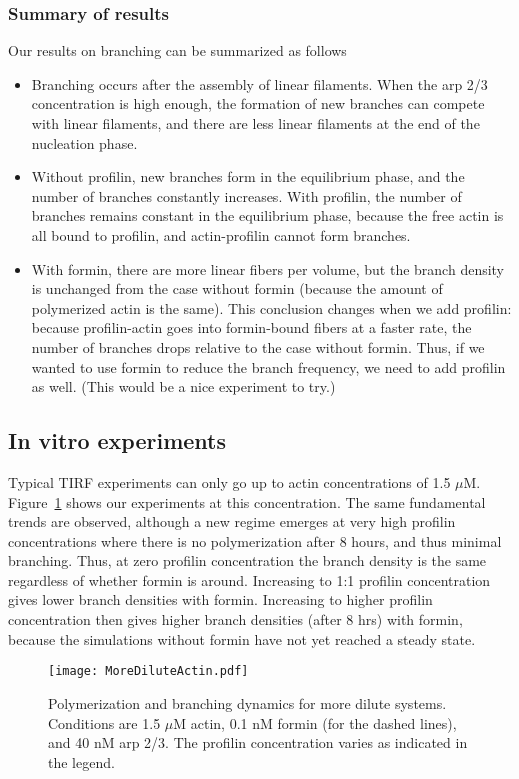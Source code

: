 \documentclass[11pt]{article}
\newcommand{\red}[1]{\color{red}#1\normalcolor}
\begin{document}
\subsubsection{Summary of results}
Our results on branching can be summarized as follows
\begin{itemize}
\item Branching occurs after the assembly of linear filaments. When the arp 2/3 concentration is high enough, the formation of new branches can compete with linear filaments, and there are less linear filaments at the end of the nucleation phase. 
\item Without profilin, new branches form in the equilibrium phase, and the number of branches constantly increases. With profilin, the number of branches remains constant in the equilibrium phase, because the free actin is all bound to profilin, and actin-profilin cannot form branches.  
\item With formin, there are more linear fibers per volume, but the branch density is unchanged from the case without formin (because the amount of polymerized actin is the same). This conclusion changes when we add profilin: because profilin-actin goes into formin-bound fibers at a faster rate, the number of branches drops relative to the case without formin. Thus, if we wanted to use formin to reduce the branch frequency, we need to add profilin as well. \red{(This would be a nice experiment to try.)}
\end{itemize}

\subsection{In vitro experiments}
Typical TIRF experiments can only go up to actin concentrations of 1.5 $\mu$M. Figure\ \ref{fig:Actin15} shows our experiments at this concentration. The same fundamental trends are observed, although a new regime emerges at very high profilin concentrations where there is no polymerization after 8 hours, and thus minimal branching. Thus, at zero profilin concentration the branch density is the same regardless of whether formin is around. Increasing to 1:1 profilin concentration gives lower branch densities with formin. Increasing to higher profilin concentration then gives higher branch densities (after 8 hrs) with formin, because the simulations without formin have not yet reached a steady state.

\begin{figure}
\centering
\texttt{[image: MoreDiluteActin.pdf]}
\caption{\label{fig:Actin15} Polymerization and branching dynamics for more dilute systems. Conditions are 1.5 $\mu$M actin, 0.1 nM formin (for the dashed lines), and 40 nM arp 2/3. The profilin concentration varies as indicated in the legend.  }
\end{figure}
\end{document}
